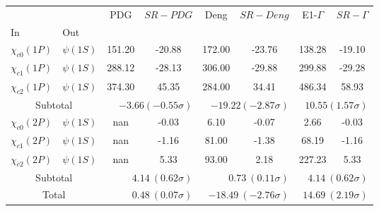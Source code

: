 \begin{tabular}{|l|l|c|c|c|c|c|c|}%
\hline%
&&PDG&$SR-PDG$&Deng&$SR-Deng$&E1-$\Gamma$&$SR-\Gamma$\\%
In&Out&&&&&&\\%
\hline%
$\chi_{c0}(1P)$&$\psi(1S)$&151.20&-20.88&172.00&-23.76&138.28&-19.10\\%
$\chi_{c1}(1P)$&$\psi(1S)$&288.12&-28.13&306.00&-29.88&299.88&-29.28\\%
$\chi_{c2}(1P)$&$\psi(1S)$&374.30&45.35&284.00&34.41&486.34&58.93\\%
\hline%
\hline%
\multicolumn{2}{|c|}{Subtotal}&\multicolumn{2}{|r|}{$-3.66 (-0.55\sigma)$}&\multicolumn{2}{|r|}{$-19.22 (-2.87\sigma)$}&\multicolumn{2}{|r|}{$10.55 (1.57\sigma)$}\\%
\hline%
\hline%
$\chi_{c0}(2P)$&$\psi(1S)$&nan&-0.03&6.10&-0.07&2.66&-0.03\\%
$\chi_{c1}(2P)$&$\psi(1S)$&nan&-1.16&81.00&-1.38&68.19&-1.16\\%
$\chi_{c2}(2P)$&$\psi(1S)$&nan&5.33&93.00&2.18&227.23&5.33\\%
\hline%
\hline%
\multicolumn{2}{|c|}{Subtotal}&\multicolumn{2}{|r|}{$4.14~(0.62\sigma)$}&\multicolumn{2}{|r|}{$0.73~(0.11\sigma)$}&\multicolumn{2}{|r|}{$4.14~(0.62\sigma)$}\\%
\hline%
\hline%
\multicolumn{2}{|c|}{Total}&\multicolumn{2}{|r|}{$0.48~(0.07\sigma)$}&\multicolumn{2}{|r|}{$-18.49~(-2.76\sigma)$}&\multicolumn{2}{|r|}{$14.69~(2.19\sigma)$}\\%
\hline%
\end{tabular}